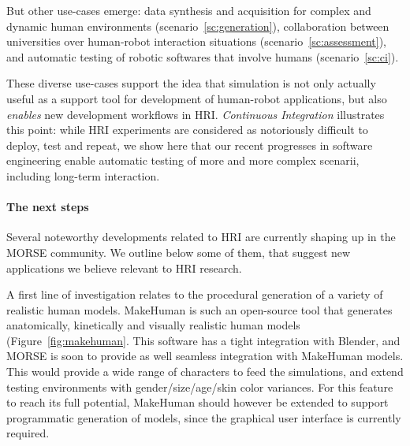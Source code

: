 \documentclass[conference]{IEEEtran}
\begin{document}
But other use-cases emerge: data synthesis and acquisition for complex and
dynamic human environments (scenario~\ref{sc:generation}), collaboration between
universities over human-robot interaction situations
(scenario~\ref{sc:assessment}), and automatic testing of robotic softwares that
involve humans (scenario~\ref{sc:ci}).

These diverse use-cases support the idea that simulation is not only actually
useful as a support tool for development of human-robot applications, but also
\emph{enables} new development workflows in HRI. \emph{Continuous Integration}
illustrates this point: while HRI experiments are considered as notoriously
difficult to deploy, test and repeat, we show here that our recent progresses in
software engineering enable automatic testing of more and more complex scenarii,
including long-term interaction.

%


\paragraph*{The next steps}

Several noteworthy developments related to HRI are currently shaping up in the
MORSE community. We outline below some of them, that suggest new applications we
believe relevant to HRI research.

A first line of investigation relates to the procedural generation of a variety
of realistic human models. {\sc MakeHuman} is such an open-source tool that
generates anatomically, kinetically and visually realistic human models
(Figure~\ref{fig:makehuman}. This software has a tight integration with Blender,
and MORSE is soon to provide as well seamless integration with {\sc MakeHuman}
models. This would provide a wide range of characters to feed the simulations,
and extend testing environments with gender/size/age/skin color variances.  For
this feature to reach its full potential, {\sc MakeHuman} should however be
extended to support programmatic generation of models, since the graphical user
interface is currently required.
\end{document}
